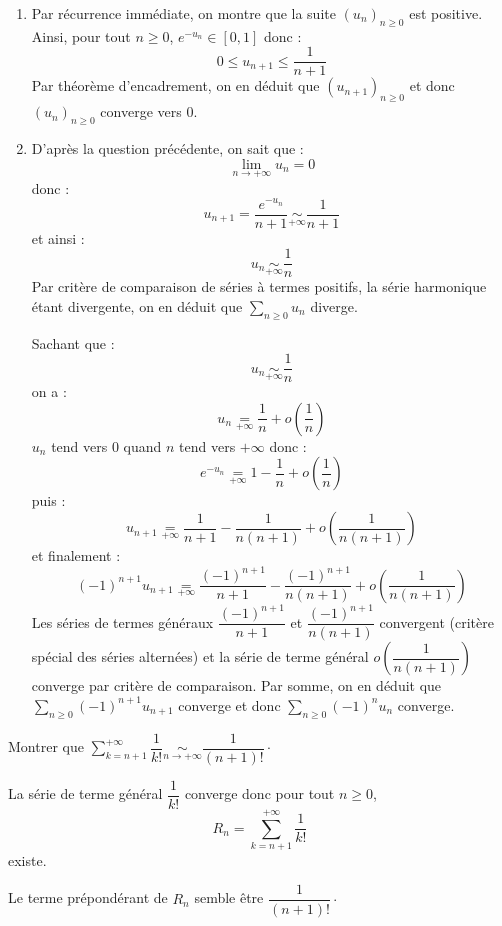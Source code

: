 \documentclass[a4paper,10pt]{report}
\newcommand{\Sum}[2]{\ensuremath{\textstyle{\sum\limits_{#1}^{#2}}}}
\begin{document}
\begin{enumerate}
\item Par récurrence immédiate, on montre que la suite $(u_n)_{n \geq 0}$ est positive. Ainsi, pour tout $n \geq 0$, $e^{-u_n} \in [0,1]$ donc :
$$ 0 \leq u_{n+1} \leq \dfrac{1}{n+1}$$
Par théorème d'encadrement, on en déduit que $(u_{n+1})_{n \geq 0}$ et donc $(u_n)_{n \geq 0}$ converge vers $0$.
\item D'après la question précédente, on sait que :
$$ \lim_{n \rightarrow + \infty} u_n = 0$$
donc :
$$ u_{n+1} = \dfrac{e^{-u_n}}{n+1} \underset{+ \infty}{\sim} \dfrac{1}{n+1}$$
et ainsi :
$$ u_n \underset{+ \infty}{\sim} \dfrac{1}{n}$$
Par critère de comparaison de séries à termes positifs, la série harmonique étant divergente, on en déduit que $\Sum{n \geq 0}{} u_n$ diverge.

\medskip

\noindent Sachant que :
$$  u_n \underset{+ \infty}{\sim} \dfrac{1}{n}$$
on a :
$$ u_n \underset{+\infty}{=} \dfrac{1}{n} + o \left( \dfrac{1}{n} \right)$$
$u_n$ tend vers $0$ quand $n$ tend vers $+ \infty$ donc :
$$ e^{-u_n} \underset{+\infty}{=} 1 -\dfrac{1}{n} + o \left( \dfrac{1}{n} \right)$$
puis :
$$ u_{n+1} \underset{+\infty}{=} \dfrac{1}{n+1} - \dfrac{1}{n(n+1)} + o \left( \dfrac{1}{n(n+1)} \right)$$
et finalement :
$$ (-1)^{n+1} u_{n+1} \underset{+\infty}{=} \dfrac{(-1)^{n+1}}{n+1} - \dfrac{(-1)^{n+1}}{n(n+1)} + o \left( \dfrac{1}{n(n+1)} \right)$$
Les séries de termes généraux $\dfrac{(-1)^{n+1}}{n+1}$ et $\dfrac{(-1)^{n+1}}{n(n+1)}$ convergent (critère spécial des séries alternées) et la série de terme général $o \left( \dfrac{1}{n(n+1)} \right)$ converge par critère de comparaison. Par somme, on en déduit que $\Sum{n \geq 0}{} (-1)^{n+1} u_{n+1}$ converge et donc $\Sum{n \geq 0}{} (-1)^n u_n$ converge.
\end{enumerate}

\begin{Exa} Montrer que $\Sum{k=n+1}{+ \infty} \dfrac{1}{k!} \underset{n \rightarrow + \infty}{\sim} \dfrac{1}{(n+1)!} \cdot$ \end{Exa}

\corr La série de terme général $\dfrac{1}{k!}$ converge donc pour tout $n \geq 0$,
$$ R_n = \Sum{k=n+1}{+ \infty} \dfrac{1}{k!}$$
existe. 

\medskip

\noindent Le terme prépondérant de $R_n$ semble être $\dfrac{1}{(n+1)!}\cdot$

\medskip
\end{document}
